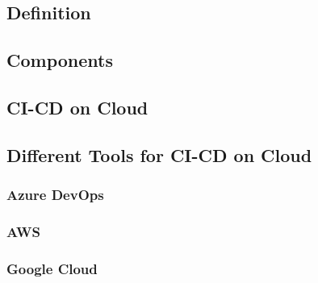 \subsection{Definition}
%
\subsection{Components}
%
\subsection{CI-CD on Cloud}
%
\subsection{Different Tools for CI-CD on Cloud}
%
\subsubsection{Azure DevOps}
%
\subsubsection{AWS}
%
\subsubsection{Google Cloud}